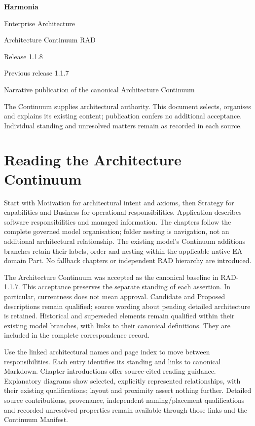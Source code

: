 \documentclass[10pt,a4paper,oneside,headings=small]{scrreprt}
\begin{document}
\hypersetup{pageanchor=false}
\begin{titlepage}
\vspace*{24mm}
{\Huge\bfseries\color{Ink} Harmonia\par}
\vspace{8mm}
{\LARGE Enterprise Architecture\par Architecture Continuum RAD\par}
\vspace{12mm}
{\Large Release 1.1.8\par Previous release 1.1.7\par}
\vfill
Narrative publication of the canonical Architecture Continuum\par
\vspace{8mm}
The Continuum supplies architectural authority. This document selects, organises
and explains its existing content; publication confers no additional acceptance.
Individual standing and unresolved matters remain as recorded in each source.
\end{titlepage}
\hypersetup{pageanchor=true}
\tableofcontents
\chapter*{Reading the Architecture Continuum}
Start with Motivation for architectural intent and axioms, then Strategy for
capabilities and Business for operational responsibilities. Application describes
software responsibilities and managed information. The chapters follow the
complete governed model organisation; folder nesting is navigation, not an
additional architectural relationship. The existing model's Continuum additions
branches retain their labels, order and nesting within the applicable native EA
domain Part. No fallback chapters or independent RAD hierarchy are introduced.

The Architecture Continuum was accepted as the canonical baseline in RAD-1.1.7.
This acceptance preserves the separate standing of each assertion. In particular,
currentness does not mean approval. Candidate and Proposed descriptions remain
qualified; source wording about pending detailed architecture is retained.
Historical and superseded elements remain qualified within their existing model
branches, with links to their canonical definitions. They are included in the
complete correspondence record.

Use the linked architectural names and page index to move between responsibilities.
Each entry identifies its standing and links to canonical Markdown. Chapter
introductions offer source-cited reading guidance. Explanatory diagrams show
selected, explicitly represented relationships, with their existing qualifications;
layout and proximity assert nothing further. Detailed source contributions,
provenance, independent naming/placement qualifications and recorded unresolved
properties remain available through those links and the Continuum Manifest.
\end{document}
